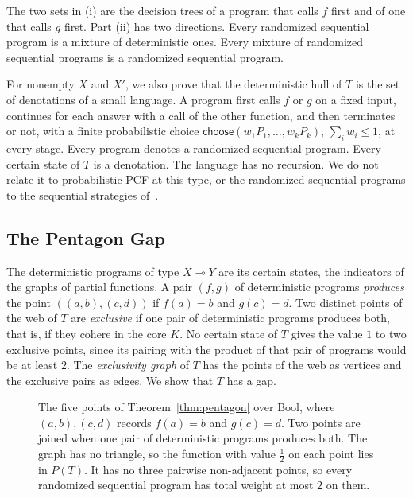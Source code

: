 \noindent
The two sets in (i) are the decision trees of a program that calls $f$
first and of one that calls $g$ first. Part (ii) has two directions. Every randomized
sequential program is a mixture of deterministic
ones. Every mixture of randomized
sequential programs is a randomized sequential
program.

For nonempty $X$ and $X'$, we also prove that the deterministic hull of $T$ is the
set of denotations of a small language. A program first
calls $f$ or $g$ on a fixed input, continues for each answer with a call
of the other function, and then terminates or not, with a finite
probabilistic choice $\mathsf{choose}(w_1 P_1, \dots, w_k P_k)$,
$\sum_i w_i \le 1$, at every stage. Every program denotes a randomized
sequential program. Every certain state of $T$
is a denotation. The language has no recursion. We do not relate it to probabilistic PCF
at this type, or the randomized sequential programs to the sequential
strategies of~\cite{castellan2018}.

\subsection{The Pentagon Gap}
\label{sec:second-pentagon}

The deterministic programs of type $X \multimap Y$ are its certain states,
the indicators of the graphs of partial functions. A pair $(f, g)$ of
deterministic programs \emph{produces} the point $((a, b), (c, d))$ if
$f(a) = b$ and $g(c) = d$. Two distinct points of the web of $T$ are
\emph{exclusive} if one pair of deterministic programs produces both, that
is, if they cohere in the core $K$. No certain state of $T$ gives the
value $1$ to two exclusive points, since its pairing with the product of
that pair of programs would be at least $2$. The \emph{exclusivity graph} of $T$ has the points of the web as
vertices and the exclusive pairs as edges. We show that $T$ has a gap.

\begin{figure}[t]
\centering
{}
\caption{The five points of Theorem~\ref{thm:pentagon} over
$\mathrm{Bool}$, where $(a, b), (c, d)$ records $f(a) = b$ and
$g(c) = d$. Two points are joined when one pair of deterministic programs
produces both. The graph has no triangle, so the function with value
$\tfrac12$ on each point lies in $P(T)$. It has no three pairwise
non-adjacent points, so every randomized sequential program has total
weight at most $2$ on them.}
\label{fig:pentagon}
\end{figure}

